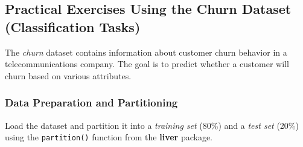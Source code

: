 \documentclass[
  11pt,
]{book}
\makeatletter
\newenvironment{Shaded}{}{}
\newcommand{\AttributeTok}[1]{#1}
\newcommand{\DecValTok}[1]{#1}
\newcommand{\FloatTok}[1]{#1}
\newcommand{\FunctionTok}[1]{#1}
\newcommand{\NormalTok}[1]{#1}
\newcommand{\OtherTok}[1]{\textcolor[rgb]{0.39,0.39,0.39}{#1}}
\newcommand{\SpecialCharTok}[1]{\textcolor[rgb]{0.39,0.39,0.39}{#1}}
\newcommand{\StringTok}[1]{\textcolor[rgb]{0.39,0.39,0.39}{#1}}
\newenvironment{kframe}{%
\medskip{}
\setlength{\fboxsep}{.8em}
 \def\at@end@of@kframe{}%
 \ifinner\ifhmode%
  \def\at@end@of@kframe{\end{minipage}}%
  \begin{minipage}{\columnwidth}%
 \fi\fi%
 \def\FrameCommand##1{\hskip\@totalleftmargin \hskip-\fboxsep
 \colorbox{shadecolor}{##1}\hskip-\fboxsep
     \hskip-\linewidth \hskip-\@totalleftmargin \hskip\columnwidth}%
 \MakeFramed {\advance\hsize-\width
   \@totalleftmargin\z@ \linewidth\hsize
   \@setminipage}}%
 {\par\unskip\endMakeFramed%
 \at@end@of@kframe}
\renewenvironment{Shaded}{\begin{kframe}}{\end{kframe}}
\theoremstyle{definition}
\theoremstyle{definition}
\theoremstyle{definition}
\theoremstyle{definition}
\theoremstyle{remark}
\makeatother
\begin{document}
\subsection*{Practical Exercises Using the Churn Dataset (Classification Tasks)}\label{practical-exercises-using-the-churn-dataset-classification-tasks}


The \emph{churn} dataset contains information about customer churn behavior in a telecommunications company. The goal is to predict whether a customer will churn based on various attributes.

\subsubsection{Data Preparation and Partitioning}\label{data-preparation-and-partitioning}

Load the dataset and partition it into a \emph{training set} (80\%) and a \emph{test set} (20\%) using the \texttt{partition()} function from the \textbf{liver} package.

\begin{Shaded}
\end{Shaded}
\end{document}
